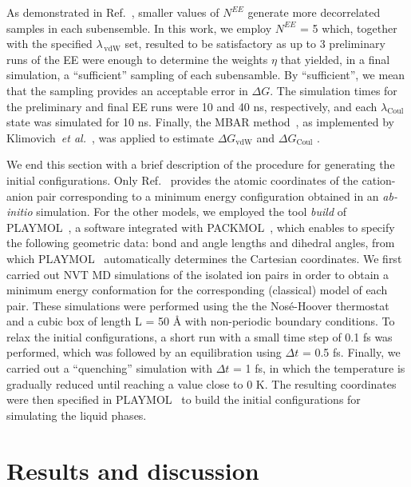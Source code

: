 \documentclass[3p,twocolumn]{elsarticle}
\begin{document}
As demonstrated in Ref.~, smaller values of $N^{EE}$ generate more decorrelated samples in each subensemble. In this work, we employ $N^{EE}$ = 5 which, together with the specified $\lambda_{\, \text{vdW}}$ set, resulted to be satisfactory as up to 3 preliminary runs of the EE were enough to determine the weights $\eta$ that yielded, in a final simulation, a ``sufficient'' sampling of each subensamble. By ``sufficient'', we mean that the sampling provides an acceptable error in $\Delta G$. The simulation times for the preliminary and final EE runs were 10 and 40 ns, respectively, and each $\lambda_{\text{Coul}}$ state was simulated for 10 ns. Finally, the MBAR method~\cite{Shirts_2008}, as implemented by Klimovich~\textit{et al.}~\cite{Klimovich_2015}, was applied to estimate $\Delta G_{\text{vdW}}$ and $\Delta G_{\text{Coul}}$ .

We end this section with a brief description of the procedure for generating the initial configurations. Only Ref.~ provides the atomic coordinates of the cation-anion pair corresponding to a minimum energy configuration obtained in an \textit{ab-initio} simulation. For the other models, we employed the tool \textit{build} of PLAYMOL~\cite{playmol}, a software integrated with PACKMOL~\cite{Mart_nez_2009}, which enables to specify the following geometric data: bond and angle lengths and dihedral angles, from which PLAYMOL~\cite{playmol} automatically determines the Cartesian coordinates. We first carried out NVT MD simulations of the isolated ion pairs in order to obtain a minimum energy conformation for the corresponding (classical) model of each pair. These simulations were performed using the the Nos\'{e}-Hoover thermostat~\cite{Martyna1992} and a cubic box of length L = 50 {\AA} with non-periodic boundary conditions. To relax the initial configurations, a short run with a small time step of 0.1 fs was performed, which was followed by an equilibration using $\Delta t$ = 0.5 fs. Finally, we carried out a ``quenching'' simulation with $\Delta t$ = 1 fs, in which the temperature is gradually reduced until reaching a value close to 0 K. The resulting coordinates were then specified in PLAYMOL~\cite{playmol} to build the initial configurations for simulating the liquid phases.

\section{Results and discussion}
\label{sec:results}
\end{document}
